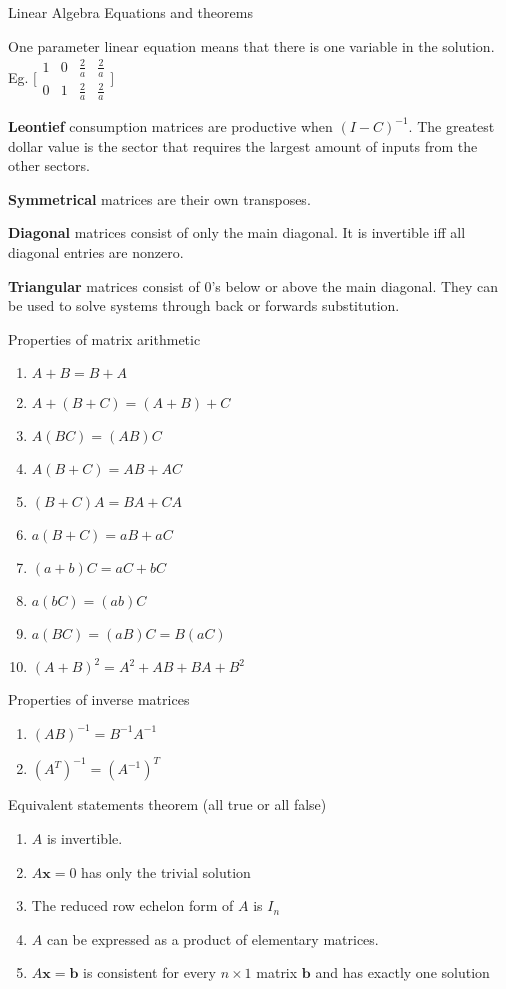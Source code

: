 \documentclass[11pt, letterpaper, twoside]{article}
\begin{document}
Linear Algebra Equations and theorems
\vspace{0.2cm}

One parameter linear equation means that there is one variable in the solution. Eg. $\big[\begin{smallmatrix}
	1 & 0 & \frac{2}{a} & \frac{2}{a}\\
	0 & 1 & \frac{2}{a} & \frac{2}{a}
\end{smallmatrix}\big]$

\textbf{Leontief} consumption matrices are productive when \((I-C)^{-1}\). The greatest dollar value is the sector that requires the largest amount of inputs from the other sectors.

\textbf{Symmetrical} matrices are their own transposes.

\textbf{Diagonal} matrices consist of only the main diagonal. It is invertible iff all diagonal entries are nonzero.

\textbf{Triangular} matrices consist of 0's below or above the main diagonal. They can be used to solve systems through back or forwards substitution.

\begin{multicols}{2}
\vspace{2mm}
Properties of matrix arithmetic %
\begin{enumerate}[label=\alph*)]
\item \(A+B=B+A\)
\item \(A+(B+C)=(A+B)+C\)
\item \(A(BC)=(AB)C\)
\item \(A(B+C)=AB+AC\)
\item \((B+C)A=BA+CA\)
\item \(a(B+C)=aB+aC\)
\item \((a+b)C=aC+bC\)
\item \(a(bC)=(ab)C\)
\item \(a(BC)=(aB)C=B(aC)\)
\item \((A+B)^2=A^2+AB+BA+B^2\)
\end{enumerate}
\columnbreak
Properties of inverse matrices %
\begin{enumerate}[label=\alph*)]
    \item \((AB)^{-1}=B^{-1}A^{-1}\)
    \item \((A^T)^{-1}=(A^{-1})^T\)
\end{enumerate}

Equivalent statements theorem (all true or all false)
\begin{enumerate}[label=-]
\item \(A\) is invertible.
\item \(A\mathbf{x}=0\) has only the trivial solution
\item The reduced row echelon form of \(A\) is \(I_n\)
\item \(A\) can be expressed as a product of elementary matrices. 
\item \(A\mathbf{x}=\mathbf{b}\) is consistent for every \(n\times1\) matrix \(\mathbf{b}\) and has exactly one solution
\end{enumerate}
\end{multicols}
\end{document}
